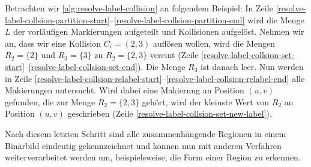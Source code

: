Betrachten wir \autoref{alg:resolve-label-collision} an folgendem Beispiel: In Zeile
 \ref{resolve-label-collsion-partition-start}--\ref{resolve-label-collsion-partition-end} wird die Menge $L$ der
 vorläufigen Markierungen aufgeteilt und Kollisionen aufgelöst. Nehmen wir an, dass wir eine Kollision $C_i = (2,3)$
 auflösen wollen, wird die Mengen $R_2 = \{2\}$ und $R_3 = \{3\}$  zu $R_2 = \{2,3\}$ vereint
 (Zeile \ref{resolve-label-collsion-set-start}--\ref{resolve-label-collsion-set-end}). Die Menge $R_3$ ist danach leer.
 Nun werden in Zeile \ref{resolve-label-collsion-relabel-start}--\ref{resolve-label-collsion-relabel-end} alle
 Makierungen untersucht. Wird dabei eine Makierung an Position $(u,v)$ gefunden, die zur Menge $R_2 = \{2,3\}$ gehört,
 wird der kleinste Wert von $R_2$ an Position $(u,v)$ geschrieben (Zeile \ref{resolve-label-collsion-set-new-label}).



Nach diesem letzten Schritt sind alle zusammenhängende Regionen in einem Binärbild eindeutig gekennzeichnet und können nun mit anderen Verfahren weiterverarbeitet werden um, beispielsweise, die Form einer Region zu erkennen.




